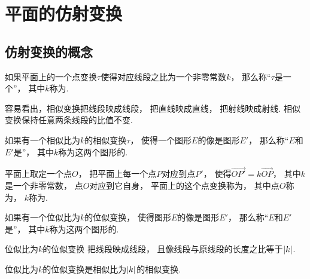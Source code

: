 \section{平面的仿射变换}
\subsection{仿射变换的概念}
\begin{definition}
如果平面上的一个点变换\(\tau\)使得对应线段之比为一个非零常数\(k\)，
那么称“\(\tau\)是一个”，
其中\(k\)称为.
\end{definition}

容易看出，相似变换把线段映成线段，
把直线映成直线，
把射线映成射线.
相似变换保持任意两条线段的比值不变.

\begin{definition}
如果有一个相似比为\(k\)的相似变换\(\tau\)，
使得一个图形\(E\)的像是图形\(E'\)，
那么称“\(E\)和\(E'\)是”，
其中\(k\)称为这两个图形的.
\end{definition}

\begin{definition}
平面上取定一个点\(O\)，
把平面上每一个点\(P\)对应到点\(P'\)，
使得\(\vec{OP'} = k \vec{OP}\)，
其中\(k\)是一个非零常数，
点\(O\)对应到它自身，
平面上的这个点变换称为，
其中点\(O\)称为，
\(k\)称为.
\end{definition}

\begin{definition}
如果有一个位似比为\(k\)的位似变换，
使得图形\(E\)的像是图形\(E'\)，
那么称“\(E\)和\(E'\)是”，
其中\(k\)称为这两个图形的.
\end{definition}

\begin{proposition}
位似比为\(k\)的位似变换
把线段映成线段，
且像线段与原线段的长度之比等于\(\abs{k}\).
\end{proposition}

\begin{corollary}
位似比为\(k\)的位似变换是相似比为\(\abs{k}\)的相似变换.
\end{corollary}

